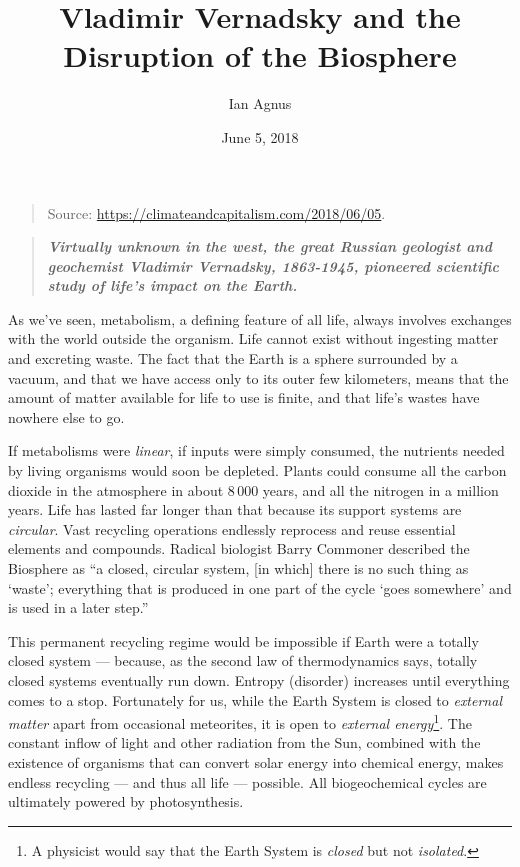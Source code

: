 \documentclass[11pt,a4paper]{article}
\title{Vladimir Vernadsky and the Disruption of the Biosphere}
\author{Ian Agnus}
\date{June 5, 2018}
\begin{document}
\maketitle
  \begin{quote}
  Source: \url{https://climateandcapitalism.com/2018/06/05}.
  \end{quote}

  \begin{quote}\it\bf 
    Virtually unknown in the west, the great Russian geologist and geochemist
    Vladimir Vernadsky, 1863-1945, pioneered scientific study of life’s impact
    on the Earth.
  \end{quote}
As we’ve seen, metabolism, a defining feature of all life, always involves
exchanges with the world outside the organism. Life cannot exist without
ingesting matter and excreting waste. The fact that the Earth is a sphere
surrounded by a vacuum, and that we have access only to its outer few
kilometers, means that the amount of matter available for life to use is
finite, and that life’s wastes have nowhere else to go.

If metabolisms were \emph{linear}, if inputs were simply consumed, the
nutrients needed by living organisms would soon be depleted. Plants could
consume all the carbon dioxide in the atmosphere in about 8\,000 years, and
all the nitrogen in a million years. Life has lasted far longer than that
because its support systems are \emph{circular}. Vast recycling operations
endlessly reprocess and reuse essential elements and compounds. Radical
biologist Barry Commoner described the Biosphere as “a closed, circular
system, [in which] there is no such thing as ‘waste’; everything that is
produced in one part of the cycle ‘goes somewhere’ and is used in a later
step.” \cite[p. 10]{1}

This permanent recycling regime would be impossible if Earth were a totally
closed system — because, as the second law of thermodynamics says, totally
closed systems eventually run down. Entropy (disorder) increases until
everything comes to a stop. Fortunately for us, while the Earth System is
closed to \emph{external matter} apart from occasional meteorites, it is open
to \emph{external energy}\footnote{A physicist would say that the Earth System
  is \emph{closed} but not \emph{isolated}.}. The constant inflow of light and
other radiation from the Sun, combined with the existence of organisms that
can convert solar energy into chemical energy, makes endless recycling — and
thus all life — possible. All biogeochemical cycles are ultimately powered by
photosynthesis.
\end{document}
